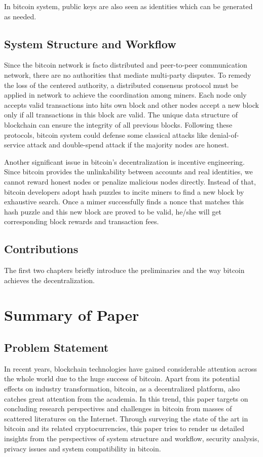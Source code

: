 \documentclass[conference]{IEEEtran}
\begin{document}
In bitcoin system, public keys are also seen as identities which can be generated as needed.

\subsection{System Structure and Workflow}
Since the bitcoin network is facto distributed and peer-to-peer communication network, there are no authorities that mediate multi-party disputes.
%
To remedy the loss of the centered authority, a distributed consensus protocol must be applied in network to achieve the coordination among miners.
%
Each node only accepts valid transactions into hits own block and other nodes accept a new block only if all transactions in this block are valid.
%
The unique data structure of blockchain can ensure the integrity of all previous blocks. 
%
Following these protocols, bitcoin system could defense some classical attacks like denial-of-service attack and double-spend attack if the majority nodes are honest.

Another significant issue in bitcoin's decentralization is incentive engineering.
%
Since bitcoin provides the unlinkability between accounts and real identities, we cannot reward honest nodes or penalize malicious nodes directly.
%
Instead of that, bitcoin developers adopt hash puzzles to incite miners to find a new block by exhaustive search.
%
Once a mimer successfully finds a nonce that matches this hash puzzle and this new block are proved to be valid, he/she will get corresponding block rewards and transaction fees.

\subsection{Contributions}
The first two chapters briefly introduce the preliminaries and the way bitcoin achieves the decentralization. 


\section{Summary of Paper\cite{bonneau2015sok}}

\subsection{Problem Statement}
In recent years, blockchain technologies have gained considerable attention across the whole world due to the huge success of bitcoin. 
%
Apart from its potential effects on industry transformation, bitcoin, as a decentralized platform, also catches great attention from the academia.
%
In this trend, this paper\cite{bonneau2015sok} targets on concluding research perspectives and challenges in bitcoin from masses of scattered literatures on the Internet.
%
Through surveying the state of the art in bitcoin and its related cryptocurrencies, this paper tries to render us detailed insights from the perspectives of system structure and workflow, security analysis, privacy issues and system compatibility in bitcoin.
\end{document}
